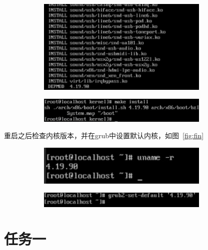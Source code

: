 \documentclass[a4paper,twoside]{article}
\begin{document}
\begin{spacing}{1.2}
\begin{figure}[H]
	\caption{配置内核并编译}
	\label{fig:install}
	\begin{subfigure}{0.45\textwidth}
		\centering
		\includegraphics*[width=0.9\textwidth]{8.png}
	\end{subfigure}
	\begin{subfigure}{0.45\textwidth}
		\centering
		\includegraphics*[width=0.9\textwidth]{9.png}
	\end{subfigure}
\end{figure}
重启之后检查内核版本，并在grub中设置默认内核，如图~\ref{fig:fin}
\begin{figure}[H]
	\centering
	\caption{使用新内核}
	\label{fig:fin}
	\begin{subfigure}{0.45\textwidth}
		\centering
		\includegraphics*[width=0.9\textwidth]{10.png}
	\end{subfigure}
	\begin{subfigure}{0.45\textwidth}
		\centering
		\includegraphics*[width=0.9\textwidth]{11.png}
	\end{subfigure}
\end{figure}


\section{任务一}


\end{spacing}
\end{document}
